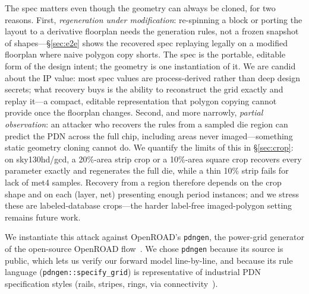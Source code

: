 \documentclass[11pt]{article}
\begin{document}
The spec matters even though the geometry can always be cloned, for two
reasons.  First, \emph{regeneration under modification}: re-spinning a
block or porting the layout to a derivative floorplan needs the
generation rules, not a frozen snapshot of shapes---\S\ref{sec:e2e}
shows the recovered spec replaying legally on a modified floorplan where
naive polygon copy shorts.  The spec is the portable, editable form of
the design intent; the geometry is one instantiation of it.  We are
candid about the IP value: most spec values are process-derived rather
than deep design secrets; what recovery buys is the ability to
reconstruct the grid exactly and replay it---a compact, editable
representation that polygon copying cannot provide once the floorplan
changes.  Second, and more narrowly, \emph{partial
observation}: an attacker who recovers the rules from a sampled die
region can predict the PDN across the full chip, including areas never
imaged---something static geometry cloning cannot do.  We quantify the
limits of this in \S\ref{sec:crop}: on sky130hd/gcd, a 20\%-area strip
crop or a 10\%-area square crop recovers every parameter exactly and
regenerates the full die, while a thin 10\% strip fails for lack of met4
samples.  Recovery from a region therefore depends on the crop shape and
on each (layer, net) presenting enough period instances; and we stress
these are labeled-database crops---the harder label-free imaged-polygon
setting remains future work.

We instantiate this attack against OpenROAD's \texttt{pdngen}, the
power-grid generator of the open-source OpenROAD
flow~\cite{ajayi2019toward,ajayi2019openroad}.  We chose
\texttt{pdngen} because its source is public, which lets us verify our
forward model line-by-line, and because its rule language
(\texttt{pdngen::specify\_grid}) is representative of industrial PDN
specification styles (rails, stripes, rings, via
connectivity~\cite{kahng2011vlsi}).
\end{document}

